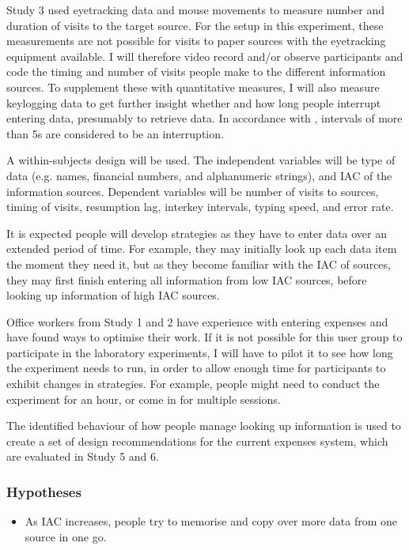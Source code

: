 \documentclass[11pt,oneside]{report}
\begin{document}
\begin{table}
Study 3 used eyetracking data and mouse movements to measure number and duration of visits to the target source. For the setup in this experiment, these measurements are not possible for visits to paper sources with the eyetracking equipment available.
I will therefore video record and/or observe participants and code the timing and number of visits people make to the different information sources.
To supplement these with quantitative measures, I will also measure keylogging data to get further insight whether and how long people interrupt entering data, presumably to retrieve data. In accordance with \citet{Gould2016}, intervals of more than 5s are considered to be an interruption. 

A within-subjects design will be used. The independent variables will be type of data (e.g. names, financial numbers, and alphanumeric strings), and IAC of the information sources. Dependent variables will be number of visits to sources, timing of visits, resumption lag, interkey intervals, typing speed, and error rate.

It is expected people will develop strategies as they have to enter data over an extended period of time. 
For example, they may initially look up each data item the moment they need it, but as they become familiar with the IAC of sources, they may first finish entering all information from low IAC sources, before looking up information of high IAC sources. 

Office workers from Study 1 and 2 have experience with entering expenses and have found ways to optimise their work. If it is not possible for this user group to participate in the laboratory experiments, I will have to pilot it to see how long the experiment needs to run, in order to allow enough time for participants to exhibit changes in strategies. For example, people might need to conduct the experiment for an hour, or come in for multiple sessions.

The identified behaviour of how people manage looking up information is used to create a set of design recommendations for the current expenses system, which are evaluated in Study 5 and 6.

\subsubsection{Hypotheses}
\begin{itemize}
\item
As IAC increases, people try to memorise and copy over more data from one source in one go.


\end{itemize}
\end{table}
\end{document}
